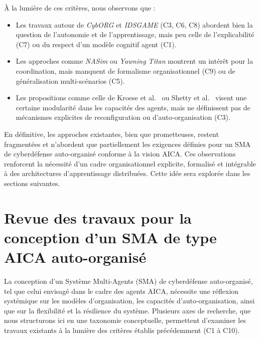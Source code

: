 \documentclass[ twoside,openright,titlepage,numbers=noenddot,headinclude,%
                footinclude=true,cleardoublepage=empty,abstractoff, %
                BCOR=5mm,paper=a4,fontsize=11pt,%
                french,american,%
                ]{scrreprt}
\begin{document}
À la lumière de ces critères, nous observons que :
\begin{itemize}
    \item Les travaux autour de \emph{CybORG} et \emph{IDSGAME} (C3, C6, C8) abordent bien la question de l'autonomie et de l'apprentissage, mais peu celle de l'explicabilité (C7) ou du respect d'un modèle cognitif agent (C1).
    \item Les approches comme \emph{NASim} ou \emph{Yawning Titan} montrent un intérêt pour la coordination, mais manquent de formalisme organisationnel (C9) ou de généralisation multi-scénarios (C5).
    \item Les propositions comme celle de Kroese et al.~\cite{Kroese2021} ou Shetty et al.~\cite{Shetty2021} visent une certaine modularité dans les capacités des agents, mais ne définissent pas de mécanismes explicites de reconfiguration ou d'auto-organisation (C3).
\end{itemize}

En définitive, les approches existantes, bien que prometteuses, restent fragmentées et n'abordent que partiellement les exigences définies pour un SMA de cyberdéfense auto-organisé conforme à la vision AICA. Ces observations renforcent la nécessité d'un cadre organisationnel explicite, formalisé et intégrable à des architectures d'apprentissage distribuées. Cette idée sera explorée dans les sections suivantes.

\section{Revue des travaux pour la conception d'un SMA de type AICA auto-organisé}\label{sec:sma-conception-aica}

La conception d'un Système Multi-Agents (SMA) de cyberdéfense auto-organisé, tel que celui envisagé dans le cadre des agents AICA, nécessite une réflexion systémique sur les modèles d'organisation, les capacités d'auto-organisation, ainsi que sur la flexibilité et la résilience du système. Plusieurs axes de recherche, que nous structurons ici en une taxonomie conceptuelle, permettent d'examiner les travaux existants à la lumière des critères établis précédemment (C1 à C10).
\end{document}
